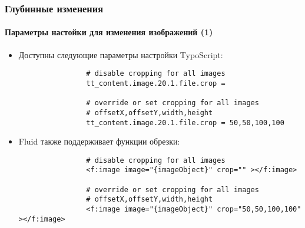 \begin{frame}[fragile]
	\frametitle{Глубинные изменения}
	\framesubtitle{Параметры настойки для изменения изображений (1)}

	\begin{itemize}
		\item Доступны следующие параметры настройки TypoScript:
			\begin{lstlisting}
				# disable cropping for all images
				tt_content.image.20.1.file.crop =

				# override or set cropping for all images
				# offsetX,offsetY,width,height
				tt_content.image.20.1.file.crop = 50,50,100,100
			\end{lstlisting}

		\item Fluid также поддерживает функции обрезки:
			\begin{lstlisting}
				# disable cropping for all images
				<f:image image="{imageObject}" crop="" ></f:image>

				# override or set cropping for all images
				# offsetX,offsetY,width,height
				<f:image image="{imageObject}" crop="50,50,100,100" ></f:image>
			\end{lstlisting}

	\end{itemize}

\end{frame}

